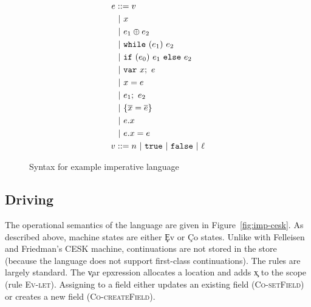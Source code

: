 \begin{figure}
\begin{align*}
    e &::= v \\
        & \bnf x \\
        & \bnf e_1 \oplus e_2 \\
        & \bnf \c{while}~(e_1)~e_2 \\
        & \bnf \c{if}~(e_0)~e_1~\c{else}~e_2 \\
        & \bnf \c{var}~x;~e \\
        & \bnf x = e \\
        & \bnf e_1;~e_2 \\
        & \bnf \{ \overline{x} = \overline{e} \} \\
        & \bnf e.x \\
        & \bnf e.x = e \\
    v &::= n \bnf \c{true} \bnf \c{false} \bnf \ell
\end{align*}
  \caption{Syntax for example imperative language}
  \label{fig:imp-syntax}
\end{figure}

\subsection{Driving}

The operational semantics of the language are given in Figure~\ref{fig:imp-cesk}.
As described above, machine states are either \c{Ev} or \c{Co} states.
Unlike with Felleisen and Friedman's CESK machine, continuations
are not stored in the store (because the language does not support first-class
continuations). 
The rules are largely standard.
The \c{var} epxression allocates a location and
adds \c{x} to the scope (rule \textsc{Ev-let}).
Assigning to a field 
either updates 
an existing field (\textsc{Co-setField})
or creates a new field (\textsc{Co-createField}).

\newcommand\then[2]{(\bullet;~#1, #2)}
\newcommand\branch[3]{(\c{if}~(\bullet)~#1~\c{else}~#2, #3)}
\newcommand\init[3]{(\bullet.#1 = #2, #3)}

\newcommand{\residual}[1]{\langle\!\langle{#1}\rangle\!\rangle}



